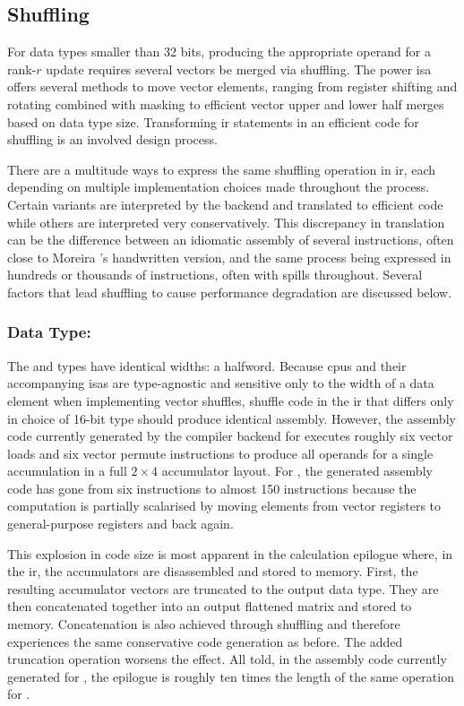 \documentclass[\main/thesis.tex]{subfiles}
\begin{document}
\subsection{Shuffling}
For data types smaller than 32 bits, producing the appropriate operand for a rank-$r$ update requires several vectors be merged via shuffling.
The \gls{power} \gls{isa} offers several methods to move vector elements, ranging from register shifting and rotating combined with masking to efficient vector upper and lower half merges based on data type size.
Transforming \gls{ir} statements in an efficient code for shuffling is an involved design process.

There are a multitude ways to express the same shuffling operation in \gls{ir}, each depending on multiple implementation choices made throughout the process.
Certain variants are interpreted by the backend and translated to efficient code while others are interpreted very conservatively.
This discrepancy in translation can be the difference between an idiomatic assembly of several instructions, often close to Moreira \etal's handwritten version, and the same process being expressed in hundreds or thousands of instructions, often with \glspl{spill} throughout.
Several factors that lead shuffling to cause performance degradation are discussed below.

\subsubsection{Data Type: \texorpdfstring{}{half}}
\label{sec:halfShuffle}
The  and  types have identical widths: a halfword.
Because \glspl{cpu} and their accompanying \glspl{isa} are type-agnostic and sensitive only to the width of a data element when implementing vector shuffles, shuffle code in the \gls{ir} that differs only in choice of 16-bit type should produce identical assembly.
However, the assembly code currently generated by the compiler backend for  executes roughly six vector loads and six vector permute instructions to produce all operands for a single accumulation in a full $2 \times 4$ accumulator layout.
For , the generated assembly code has gone from six instructions to almost 150 instructions because the computation is partially scalarised by moving elements from vector registers to general-purpose registers and back again.

This explosion in code size is most apparent in the calculation epilogue where, in the \gls{ir}, the accumulators are disassembled and stored to memory.
First, the resulting accumulator vectors are truncated to the output data type.
They are then concatenated together into an output flattened matrix and stored to memory.
Concatenation is also achieved through shuffling and therefore experiences the same conservative code generation as before.
The added truncation operation worsens the effect.
All told, in the assembly code currently generated for , the epilogue is roughly ten times the length of the same operation for .
\end{document}
